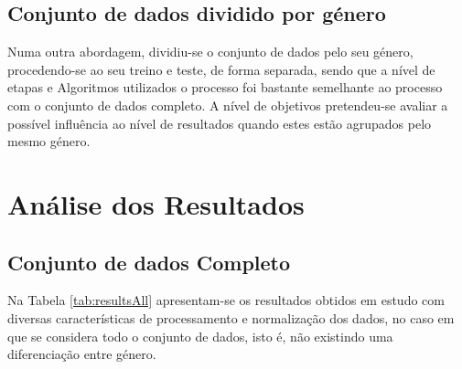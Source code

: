 \documentclass[12pt,a4paper,twoside]{report}
\begin{document}
{\subsection{Conjunto de dados dividido por género}

Numa outra abordagem, dividiu-se o conjunto de dados pelo seu género, procedendo-se ao seu treino e teste, de forma separada, sendo que a nível de etapas e Algoritmos utilizados o processo foi bastante semelhante ao processo com o conjunto de dados completo. A nível de objetivos pretendeu-se avaliar a possível influência ao nível de resultados quando estes estão agrupados pelo mesmo género.


\section{Análise dos Resultados}

\subsection{Conjunto de dados Completo}

Na Tabela \ref{tab:resultsAll} apresentam-se os resultados obtidos em estudo com diversas características de processamento e normalização dos dados, no caso em que se considera todo o conjunto de dados, isto é, não existindo uma diferenciação entre género. 

}
\end{document}
